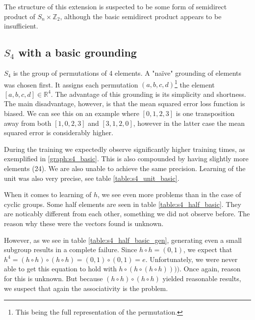 The structure of this extension is suspected to be some form of semidirect product of $S_n\times\mathbb{Z}_2$, although the basic semidirect product appears to be insufficient.

\subsection{$S_4$ with a basic grounding}

$S_4$ is the group of permutations of 4 elements. A "na\"{i}ve" grounding of elements was chosen first. It assigns each permutation $(a,b,c,d)$\footnote{This being the full representation of the permutation.} the element $[a,b,c,d]\in\mathbb{R}^4$. The advantage of this grounding is its simplicity and shortness. The main disadvantage, however, is that the mean squared error loss function is biased. We can see this on an example where $[0,1,2,3]$ is one transposition away from both $[1,0,2,3]$ and $[3,1,2,0]$, however in the latter case the mean squared error is considerably higher. 

During the training we expectedly observe significantly higher training times, as exemplified in \autoref{graph:s4_basic}. This is also compounded by having slightly more elements (24). We are also unable to achieve the same precision. Learning of the unit was also very precise, see table \ref{table:s4_unit_basic}.

When it comes to learning of $h$, we see even more problems than in the case of cyclic groups. Some half elements are seen in table \ref{table:s4_half_basic}. They are noticably different from each other, something we did not observe before. The reason why these were the vectors found is unknown. 

However, as we see in table \ref{table:s4_half_basic_gen}, generating even a small subgroup results in a complete failure. Since $h\circ h=(0,1)$, we expect that $h^4=(h\circ h)\circ(h\circ h)=(0,1)\circ(0,1)=e$. Unfortunately, we were never able to get this equation to hold with $h\circ(h\circ(h\circ h))))$. Once again, reason for this is unknown. But because $(h\circ h)\circ (h\circ h)$ yielded reasonable results, we suspect that again the associativity is the problem.

